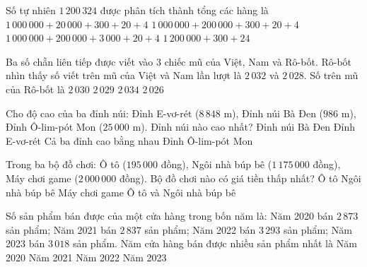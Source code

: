 \begin{ex} %
Số tự nhiên $1\,200\,324$ được phân tích thành tổng các hàng là
\choice
{$1\,000\,000 + 20\,000 + 300 + 20 + 4$}
{\True $1\,000\,000 + 200\,000 + 300 + 20 + 4$}
{$1\,000\,000 + 200\,000 + 3\,000 + 20 + 4$}
{$1\,200\,000 + 300 + 24$}
\end{ex}

\begin{ex} %
Ba số chẵn liên tiếp được viết vào $3$ chiếc mũ của Việt, Nam và Rô-bốt. Rô-bốt nhìn thấy số viết trên mũ của Việt và Nam lần lượt là $2\,032$ và $2\,028$. Số trên mũ của Rô-bốt là
\choice
{\True $2\,030$}
{$2\,029$}
{$2\,034$}
{$2\,026$}
\end{ex}

\begin{ex} %
Cho độ cao của ba đỉnh núi: Đỉnh E-vơ-rét ($8\,848\text{ m}$), Đỉnh núi Bà Đen ($986\text{ m}$), Đỉnh Ô-lim-pót Mon ($25\,000\text{ m}$). Đỉnh núi nào cao nhất?
\choice
{Đỉnh núi Bà Đen}
{Đỉnh E-vơ-rét}
{Cả ba đỉnh cao bằng nhau}
{\True Đỉnh Ô-lim-pót Mon}
\end{ex}

\begin{ex} %
Trong ba bộ đồ chơi: Ô tô ($195\,000$ đồng), Ngôi nhà búp bê ($1\,175\,000$ đồng), Máy chơi game ($2\,000\,000$ đồng). Bộ đồ chơi nào có giá tiền thấp nhất?
\choice
{\True Ô tô}
{Ngôi nhà búp bê}
{Máy chơi game}
{Ô tô và Ngôi nhà búp bê}
\end{ex}

\begin{ex} %
Số sản phẩm bán được của một cửa hàng trong bốn năm là: Năm 2020 bán $2\,873$ sản phẩm; Năm 2021 bán $2\,837$ sản phẩm; Năm 2022 bán $3\,293$ sản phẩm; Năm 2023 bán $3\,018$ sản phẩm. Năm cửa hàng bán được nhiều sản phẩm nhất là
\choice
{Năm 2020}
{Năm 2021}
{\True Năm 2022}
{Năm 2023}
\end{ex}

